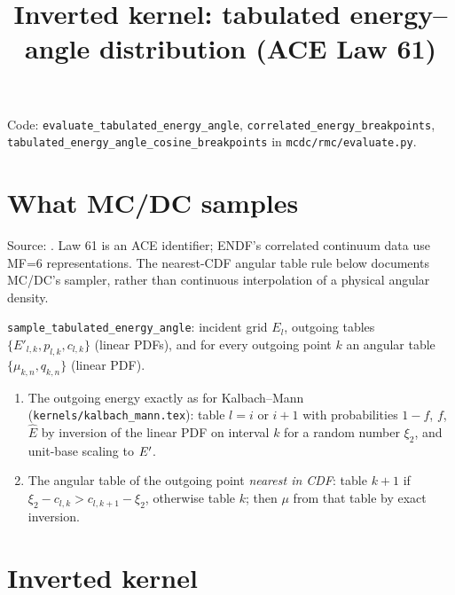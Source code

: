 \documentclass[11pt]{article}
\title{Inverted kernel: tabulated energy--angle distribution (ACE Law 61)}
\date{}
\begin{document}
\maketitle

\noindent Code: \texttt{evaluate\_tabulated\_energy\_angle},
\texttt{correlated\_energy\_breakpoints},
\texttt{tabulated\_energy\_angle\_cosine\_breakpoints} in \texttt{mcdc/rmc/evaluate.py}.

\section{What MC/DC samples}

\noindent Source: . Law 61 is an ACE identifier; ENDF's
correlated continuum data use MF=6 representations. The nearest-CDF angular
table rule below documents MC/DC's sampler, rather than continuous interpolation
of a physical angular density.

\texttt{sample\_tabulated\_energy\_angle}: incident grid $E_l$, outgoing tables
$\{E'_{l,k}, p_{l,k}, c_{l,k}\}$ (linear PDFs), and for every outgoing point $k$ an
angular table $\{\mu_{k,n}, q_{k,n}\}$ (linear PDF).
\begin{enumerate}
  \item The outgoing energy exactly as for Kalbach--Mann
  (\texttt{kernels/kalbach\_mann.tex}): table $l = i$ or $i+1$ with probabilities $1-f$, $f$,
  $\hat E$ by inversion of the linear PDF on interval $k$ for a random number $\xi_2$,
  and unit-base scaling to $E'$.
  \item The angular table of the outgoing point \emph{nearest in CDF}: table $k+1$ if
  $\xi_2 - c_{l,k} > c_{l,k+1} - \xi_2$, otherwise table $k$; then $\mu$ from that
  table by exact inversion.
\end{enumerate}

\section{Inverted kernel}
\end{document}

